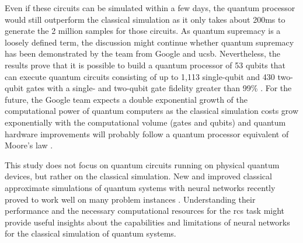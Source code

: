 Even if these circuits can be simulated within a few days, the quantum
processor would still outperform the classical simulation as it only
takes about 200ms to generate the 2 million samples for those circuits. As quantum
supremacy is a loosely defined term, the discussion might continue whether
quantum supremacy has been demonstrated by the team from Google and \gls{ucsb}. Nevertheless, 
the results prove that it is possible to build a quantum processor of 53 qubits
that can execute quantum circuits consisting of up to 1,113 single-qubit and
430 two-qubit gates with a single- and two-qubit gate fidelity greater than 99\% \cite{martines2019supremacy}.
For the future, the Google team expects a double exponential growth of the computational
power of quantum computers as the classical simulation costs grow exponentially
with the computational volume (gates and qubits) and quantum hardware
improvements will probably follow a quantum processor equivalent of Moore's law \cite{martines2019supremacy}.

This study does not focus on quantum circuits running on physical quantum devices,
but rather on the classical simulation. New and improved classical
approximate simulations of quantum systems with neural networks recently proved
to work well on many problem instances \cite{jnsson2018neuralnetwork,carleo2017solving,medvidovic2020classical,carleo2018constructing}. 
Understanding their performance and the necessary computational resources for
the \gls{rcs} task might provide useful insights about the capabilities and
limitations of neural networks for the classical simulation of quantum systems.